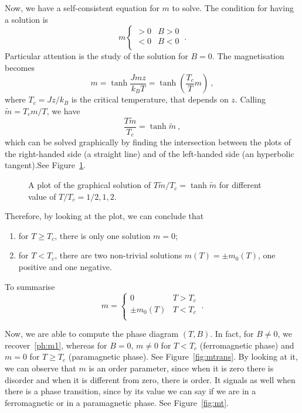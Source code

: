     Now, we have a self-consistent equation for $m$ to solve. The condition for having a solution is 
    \begin{equation}\label{ph:m1}
        m \begin{cases}
            > 0 & B > 0 \\
            < 0 & B < 0 \\
        \end{cases} ~.
    \end{equation}
    Particular attention is the study of the solution for $B = 0$. The magnetisation becomes
    \begin{equation*}
        m = \tanh \frac{J m z}{k_B T} = \tanh (\frac{T_c}{T} m) ~,
    \end{equation*}
    where $T_c = J z / k_B$ is the critical temperature, that depends on $z$. Calling $\tilde m = T_c m / T$, we have 
    \begin{equation*}
        \frac{T \tilde m}{T_c} = \tanh \tilde m ~,
    \end{equation*}
    which can be solved graphically by finding the intersection between the plots of the right-handed side (a straight line) and of the left-handed side (an hyperbolic tangent).See Figure~\ref{mf:m}.
    \begin{figure}[h!]
        \centering
        \caption{A plot of the graphical solution of $T \tilde m / T_c = \tanh \tilde m$ for different value of $T/T_c = 1/2, 1, 2$.}
        \label{mf:m}
    \end{figure}
    Therefore, by looking at the plot, we can conclude that 
    \begin{enumerate}
        \item for $T \geq T_c$, there is only one solution $m = 0$;
        \item for $T < T_c$, there are two non-trivial solutions $m(T) = \pm m_0 (T)$, one positive and one negative.
    \end{enumerate}
    To summarise 
    \begin{equation}\label{ph:mtc}
        m = \begin{cases}
            0 & T > T_c \\ 
            \pm m_0(T) & T < T_c \\ 
        \end{cases} ~.
    \end{equation}

    Now, we are able to compute the phase diagram $(T, B)$. In fact, for $B \neq 0$, we recover~\eqref{ph:m1}, whereas for $B=0$, $m \neq 0$ for $T < T_c$ (ferromagnetic phase) and $m = 0$ for $T \geq T_c$ (paramagnetic phase). See Figure~\eqref{fig:mtrans}. By looking at it, we can observe that $m$ is an order parameter, since when it is zero there is disorder and when it is different from zero, there is order. It signals as well when there is a phase transition, since by its value we can say if we are in a ferromagnetic or in a paramagnetic phase. See Figure~\eqref{fig:mt}.
    
